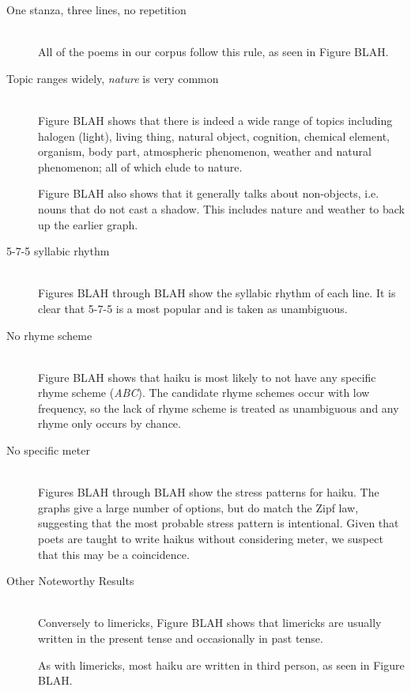 \begin{description}
\item[One stanza, three lines, no repetition]  \hfill \\
All of the poems in our corpus follow this rule, as seen in Figure BLAH.

\item[Topic ranges widely, \textit{nature} is very common]  \hfill \\
Figure BLAH shows that there is indeed a wide range of topics including halogen (light), living thing, natural object, cognition, chemical element, organism, body part, atmospheric phenomenon, weather and natural phenomenon; all of which elude to nature. 

Figure BLAH also shows that it generally talks about non-objects, i.e. nouns that do not cast a shadow. This includes nature and weather to back up the earlier graph.

\item[5-7-5 syllabic rhythm]  \hfill \\
Figures BLAH through BLAH show the syllabic rhythm of each line. It is clear that 5-7-5 is a most popular and is taken as unambiguous.

\item[No rhyme scheme]  \hfill \\
Figure BLAH shows that haiku is most likely to not have any specific rhyme scheme (\textit{ABC}). The candidate rhyme schemes occur with low frequency, so the lack of rhyme scheme is treated as unambiguous and any rhyme only occurs by chance.

\item[No specific meter]  \hfill \\
Figures BLAH through BLAH show the stress patterns for haiku. The graphs give a large number of options, but do match the Zipf law, suggesting that the most probable stress pattern is intentional. Given that poets are taught to write haikus without considering meter, we suspect that this may be a coincidence.

\item[Other Noteworthy Results]  \hfill \\
Conversely to limericks, Figure BLAH shows that limericks are usually written in the present tense and occasionally in past tense.

As with limericks, most haiku are written in third person, as seen in Figure BLAH.

\end{description}

